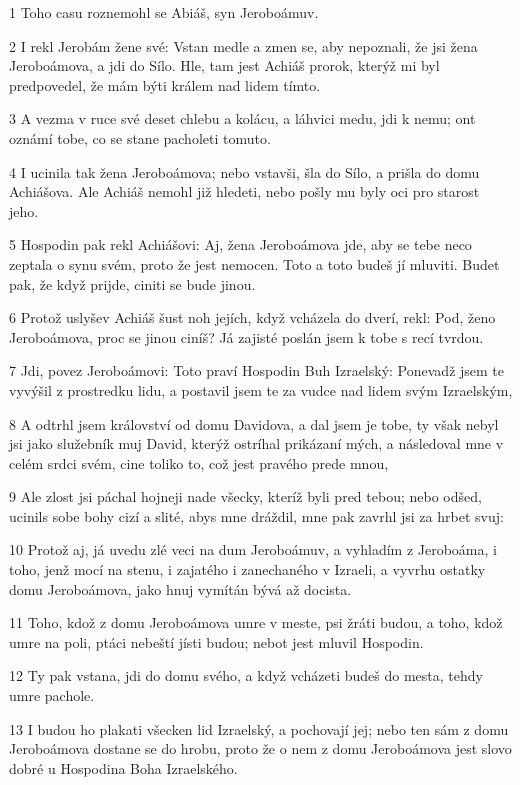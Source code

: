 \par 1 Toho casu roznemohl se Abiáš, syn Jeroboámuv.
\par 2 I rekl Jerobám žene své: Vstan medle a zmen se, aby nepoznali, že jsi žena Jeroboámova, a jdi do Sílo. Hle, tam jest Achiáš prorok, kterýž mi byl predpovedel, že mám býti králem nad lidem tímto.
\par 3 A vezma v ruce své deset chlebu a kolácu, a láhvici medu, jdi k nemu; ont oznámí tobe, co se stane pacholeti tomuto.
\par 4 I ucinila tak žena Jeroboámova; nebo vstavši, šla do Sílo, a prišla do domu Achiášova. Ale Achiáš nemohl již hledeti, nebo pošly mu byly oci pro starost jeho.
\par 5 Hospodin pak rekl Achiášovi: Aj, žena Jeroboámova jde, aby se tebe neco zeptala o synu svém, proto že jest nemocen. Toto a toto budeš jí mluviti. Budet pak, že když prijde, ciniti se bude jinou.
\par 6 Protož uslyšev Achiáš šust noh jejích, když vcházela do dverí, rekl: Pod, ženo Jeroboámova, proc se jinou ciníš? Já zajisté poslán jsem k tobe s recí tvrdou.
\par 7 Jdi, povez Jeroboámovi: Toto praví Hospodin Buh Izraelský: Ponevadž jsem te vyvýšil z prostredku lidu, a postavil jsem te za vudce nad lidem svým Izraelským,
\par 8 A odtrhl jsem království od domu Davidova, a dal jsem je tobe, ty však nebyl jsi jako služebník muj David, kterýž ostríhal prikázaní mých, a následoval mne v celém srdci svém, cine toliko to, což jest pravého prede mnou,
\par 9 Ale zlost jsi páchal hojneji nade všecky, kteríž byli pred tebou; nebo odšed, ucinils sobe bohy cizí a slité, abys mne dráždil, mne pak zavrhl jsi za hrbet svuj:
\par 10 Protož aj, já uvedu zlé veci na dum Jeroboámuv, a vyhladím z Jeroboáma, i toho, jenž mocí na stenu, i zajatého i zanechaného v Izraeli, a vyvrhu ostatky domu Jeroboámova, jako hnuj vymítán bývá až docista.
\par 11 Toho, kdož z domu Jeroboámova umre v meste, psi žráti budou, a toho, kdož umre na poli, ptáci nebeští jísti budou; nebot jest mluvil Hospodin.
\par 12 Ty pak vstana, jdi do domu svého, a když vcházeti budeš do mesta, tehdy umre pachole.
\par 13 I budou ho plakati všecken lid Izraelský, a pochovají jej; nebo ten sám z domu Jeroboámova dostane se do hrobu, proto že o nem z domu Jeroboámova jest slovo dobré u Hospodina Boha Izraelského.
